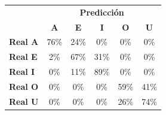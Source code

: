 \begin{tabular}{lccccc}
\toprule
 & \multicolumn{5}{c}{\textbf{Predicción}} \\
 & \textbf{A} & \textbf{E} & \textbf{I} & \textbf{O} & \textbf{U} \\
\midrule
\textbf{Real A} & \cellcolor[rgb]{0.47,0.47,1.00} \color{white} 76\% & \cellcolor[rgb]{0.83,0.83,1.00}  24\% & \cellcolor[rgb]{1.00,1.00,1.00}  0\% & \cellcolor[rgb]{1.00,1.00,1.00}  0\% & \cellcolor[rgb]{1.00,1.00,1.00}  0\% \\
\textbf{Real E} & \cellcolor[rgb]{0.99,0.99,1.00}  2\% & \cellcolor[rgb]{0.53,0.53,1.00} \color{white} 67\% & \cellcolor[rgb]{0.79,0.79,1.00}  31\% & \cellcolor[rgb]{1.00,1.00,1.00}  0\% & \cellcolor[rgb]{1.00,1.00,1.00}  0\% \\
\textbf{Real I} & \cellcolor[rgb]{1.00,1.00,1.00}  0\% & \cellcolor[rgb]{0.93,0.93,1.00}  11\% & \cellcolor[rgb]{0.37,0.37,1.00} \color{white} 89\% & \cellcolor[rgb]{1.00,1.00,1.00}  0\% & \cellcolor[rgb]{1.00,1.00,1.00}  0\% \\
\textbf{Real O} & \cellcolor[rgb]{1.00,1.00,1.00}  0\% & \cellcolor[rgb]{1.00,1.00,1.00}  0\% & \cellcolor[rgb]{1.00,1.00,1.00}  0\% & \cellcolor[rgb]{0.59,0.59,1.00} \color{white} 59\% & \cellcolor[rgb]{0.71,0.71,1.00}  41\% \\
\textbf{Real U} & \cellcolor[rgb]{1.00,1.00,1.00}  0\% & \cellcolor[rgb]{1.00,1.00,1.00}  0\% & \cellcolor[rgb]{1.00,1.00,1.00}  0\% & \cellcolor[rgb]{0.82,0.82,1.00}  26\% & \cellcolor[rgb]{0.48,0.48,1.00} \color{white} 74\% \\
\bottomrule
\end{tabular}